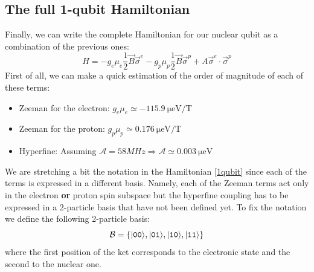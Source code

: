 \subsection{The full 1-qubit Hamiltonian}
Finally, we can write the complete Hamiltonian for our nuclear qubit as a combination of the previous ones:
\begin{equation}
  H = -g_e\mu_e\frac{1}{2}\vec{B}\vec{\sigma}^e
      -g_p\mu_p\frac{1}{2}\vec{B}\vec{\sigma}^p
      +A\vec{\sigma}^e\cdot\vec{\sigma}^p
\label{1qubit}
\end{equation}
First of all, we can make a quick estimation of the order of magnitude of each of these terms:
\begin{itemize}
  \item Zeeman for the electron: $g_e\mu_e\simeq\SI{-115.9}{\micro\eV\per\tesla}$
  \item Zeeman for the proton: $g_p\mu_p\simeq\SI{0.176}{\micro\eV\per\tesla}$
  \item Hyperfine: Assuming
  $\mathcal{A}=58MHz\Rightarrow\mathcal{A}\simeq\SI{0.003}{\micro\eV}$
\end{itemize}
We are stretching a bit the notation in the Hamiltonian \eqref{1qubit} since each of the terms is expressed in a different basis. Namely, each of the Zeeman terms act only in the electron \textbf{or} proton spin subspace but the hyperfine coupling has to be expressed in a 2-particle basis that have not been defined yet.
To fix the notation we define the following 2-particle basis:
\begin{equation}
  \mathcal{B}=\left\{|\texttt{0}\texttt{0}\rangle,|\texttt{0}\texttt{1}\rangle,
                     |\texttt{1}\texttt{0}\rangle,|\texttt{1}\texttt{1}\rangle\right\}
\label{basis}
\end{equation}
where the first position of the ket corresponds to the electronic state and the second to the nuclear one.

